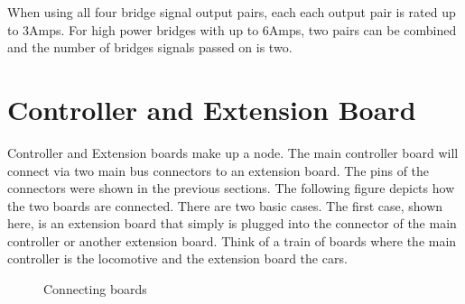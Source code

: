 When using all four bridge signal output pairs, each each output pair is rated up to 3Amps. For high power bridges with up to 6Amps, two pairs can be combined and the number of bridges signals passed on is two.

\section{Controller and Extension Board}

Controller and Extension boards make up a node. The main controller board will connect via two main bus connectors to an extension board. The pins of the connectors were shown in the previous sections. The following figure depicts how the two boards are connected. There are two basic cases. The first case, shown here, is an extension board that simply is plugged into the connector of the main controller or another extension board. Think of a train of boards where the main controller is the locomotive and the extension board the cars. 

\begin{figure}[htbp]
    \centering
    \caption{Connecting boards}
\end{figure}

